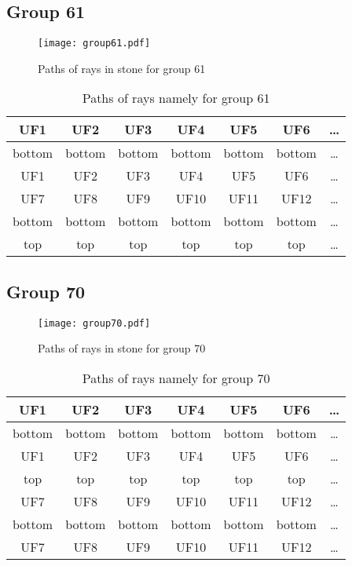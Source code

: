 \subsection*{Group 61}






\begin{figure}[h!]
\centering
\texttt{[image: group61.pdf]}
\caption{Paths of rays in stone for group 61}
\label{table:FigGroup61}
\end{figure}



\begin{table}[h!]
\centering
\begin{tabular}{|c|c|c|c|c|c|c|}
\hline
UF1 & UF2 & UF3 & UF4 & UF5 & UF6 & \dots \\
\hline
bottom & bottom & bottom & bottom & bottom & bottom & \dots \\
\hline
UF1 & UF2 & UF3 & UF4 & UF5 & UF6 & \dots \\
\hline
UF7 & UF8 & UF9 & UF10 & UF11 & UF12 & \dots \\
\hline
bottom & bottom & bottom & bottom & bottom & bottom & \dots \\
\hline
top & top & top & top & top & top & \dots \\
\hline
\end{tabular}
\caption{Paths of rays namely for group 61}
\label{table:TableGroup61}
\end{table}
\newpage
\subsection*{Group 70}






\begin{figure}[h!]
\centering
\texttt{[image: group70.pdf]}
\caption{Paths of rays in stone for group 70}
\label{table:FigGroup70}
\end{figure}



\begin{table}[h!]
\centering
\begin{tabular}{|c|c|c|c|c|c|c|}
\hline
UF1 & UF2 & UF3 & UF4 & UF5 & UF6 & \dots \\
\hline
bottom & bottom & bottom & bottom & bottom & bottom & \dots \\
\hline
UF1 & UF2 & UF3 & UF4 & UF5 & UF6 & \dots \\
\hline
top & top & top & top & top & top & \dots \\
\hline
UF7 & UF8 & UF9 & UF10 & UF11 & UF12 & \dots \\
\hline
bottom & bottom & bottom & bottom & bottom & bottom & \dots \\
\hline
UF7 & UF8 & UF9 & UF10 & UF11 & UF12 & \dots \\
\hline
\end{tabular}
\caption{Paths of rays namely for group 70}
\label{table:TableGroup70}
\end{table}
\newpage

